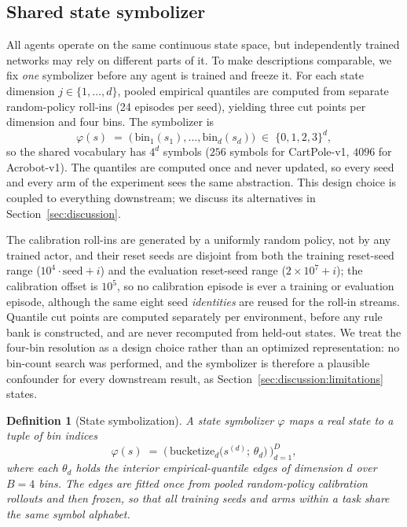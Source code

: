 \documentclass[11pt]{article}
\newtheorem{definition}{Definition}
\begin{document}
\subsection{Shared state symbolizer}
\label{sec:method:symbolizer}

All agents operate on the same continuous state space, but independently trained networks may rely
on different parts of it. To make descriptions comparable, we fix \emph{one} symbolizer before any
agent is trained and freeze it. For each state dimension $j\in\{1,\ldots,d\}$, pooled empirical
quantiles are computed from separate random-policy roll-ins (24 episodes per seed), yielding three
cut points per dimension and four bins. The symbolizer is
\begin{equation}
\varphi(s) \;=\; \big(\,\mathrm{bin}_1(s_1),\ldots,\mathrm{bin}_d(s_d)\big)\;\in\;\{0,1,2,3\}^{d},
\label{eq:symbolizer}
\end{equation}
so the shared vocabulary has $4^{d}$ symbols ($256$ symbols for CartPole-v1, $4096$ for
Acrobot-v1). The quantiles are computed once and never updated, so every seed and every arm of the
experiment sees the same abstraction. This design choice is coupled to everything downstream; we
discuss its alternatives in Section~\ref{sec:discussion}.

The calibration roll-ins are generated by a uniformly random policy, not by any trained actor, and
their reset seeds are disjoint from both the training reset-seed range ($10^{4}\cdot\text{seed}+i$)
and the evaluation reset-seed range ($2\times10^{7}+i$); the calibration offset is $10^{5}$, so no
calibration episode is ever a training or evaluation episode, although the same eight seed
\emph{identities} are reused for the roll-in streams. Quantile cut points are computed separately per
environment, before any rule bank is constructed, and are never recomputed from held-out states. We
treat the four-bin resolution as a design choice rather than an optimized representation: no bin-count
search was performed, and the symbolizer is therefore a plausible confounder for every downstream
result, as Section~\ref{sec:discussion:limitations} states.

\begin{definition}[State symbolization]
\label{def:symbolizer}
A \emph{state symbolizer} $\varphi$ maps a real state to a tuple of bin indices
\begin{equation}
\varphi(s) \;=\; \big(\,\mathrm{bucketize}_{d}\!\big(s^{(d)};\,\theta_{d}\big)\,\big)_{d=1}^{D},
\label{eq:symbolize:def}
\end{equation}
where each $\theta_{d}$ holds the interior empirical-quantile edges of dimension $d$ over $B=4$
bins. The edges are fitted once from pooled random-policy calibration rollouts and then \emph{frozen},
so that all training seeds and arms within a task share the same symbol alphabet.
\end{definition}
\end{document}
